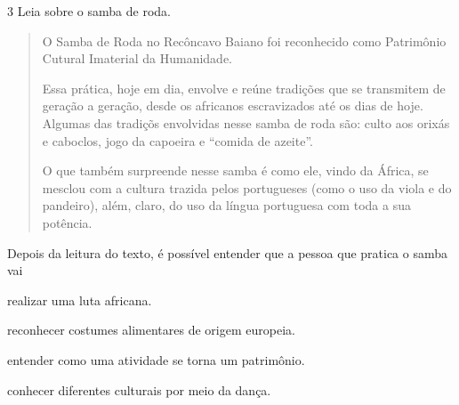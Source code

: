 \pagebreak
\num{3} Leia sobre o samba de roda.
\begin{quote}
O Samba de Roda no Recôncavo Baiano foi reconhecido como Patrimônio Cutural Imaterial da Humanidade.

Essa prática, hoje em dia, envolve e reúne tradições que se transmitem de geração a geração, desde os africanos escravizados até os dias de hoje. Algumas das tradiçõs envolvidas nesse samba de roda são: culto aos orixás e caboclos, jogo da capoeira e “comida de azeite”.

O que também surpreende nesse samba é como ele, vindo da África, se mesclou com a cultura trazida pelos portugueses (como o uso da viola e do pandeiro), além, claro, do uso da língua portuguesa com toda a sua potência.


\end{quote}

\noindent{}Depois da leitura do texto, é possível entender que a pessoa que pratica o samba vai

\begin{escolha}
\item realizar uma luta africana.

\item reconhecer costumes alimentares de origem europeia.

\item entender como uma atividade se torna um patrimônio.

\item conhecer diferentes culturais por meio da dança.
\end{escolha}

